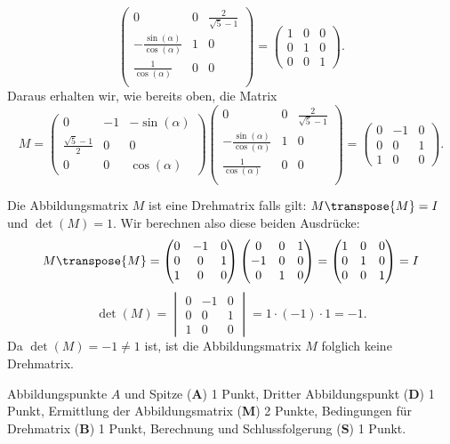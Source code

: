 \begin{loesung}
\begin{teilaufgaben}
\[\begin{pmatrix}
0&0&\frac{2}{\sqrt{5}-1}\\
-\frac{\sin(\alpha)}{\cos(\alpha)}&1&0\\
\frac{1}{\cos(\alpha)}&0&0\\
\end{pmatrix}
=
\begin{pmatrix}
1&0&0\\
0&1&0\\
0&0&1
\end{pmatrix}.
\]
Daraus erhalten wir, wie bereits oben, die Matrix 
\[
M=
\begin{pmatrix}
0                   &-1&-\sin(\alpha)\\
\frac{\sqrt{5}-1}{2}& 0&0\\
0                   & 0&\cos(\alpha)
\end{pmatrix}
\begin{pmatrix}
0&0&\frac{2}{\sqrt{5}-1}\\
-\frac{\sin(\alpha)}{\cos(\alpha)}&1&0\\
\frac{1}{\cos(\alpha)}&0&0\\
\end{pmatrix}
=
\begin{pmatrix}
0&-1&0\\
0&0&1\\
1&0&0
\end{pmatrix}.
\]
\item
Die Abbildungsmatrix $M$ ist eine Drehmatrix falls gilt: $M\transpose{M}= I $ und $\det(M) = 1$.
Wir berechnen also diese beiden Ausdrücke:
\[
M\transpose{M} = 
\begin{pmatrix}
0&-1&0\\
0&0&1\\
1&0&0
\end{pmatrix}
\begin{pmatrix}
0&0&1\\
-1&0&0\\
0 &1&0
\end{pmatrix}
=
\begin{pmatrix}
1&0&0\\
0&1&0\\
0 &0&1
\end{pmatrix} = I
\]
\[
\det(M) = 
\begin{vmatrix}
0&-1&0\\
0&0&1\\
1&0&0
\end{vmatrix}
= 
1\cdot(-1)\cdot 1 = -1.
\]
Da $\det(M) = -1 \neq 1$ ist, ist die Abbildungsmatrix $M$ folglich keine Drehmatrix.
\qedhere
\end{teilaufgaben}
\end{loesung}

\begin{bewertung}
Abbildungspunkte $A$ und Spitze ({\bf A}) 1 Punkt,
Dritter Abbildungspunkt ({\bf D}) 1 Punkt,
Ermittlung der Abbildungsmatrix ({\bf M}) 2 Punkte,
Bedingungen für Drehmatrix ({\bf B}) 1 Punkt,
Berechnung und Schlussfolgerung ({\bf S}) 1 Punkt.
\end{bewertung}

